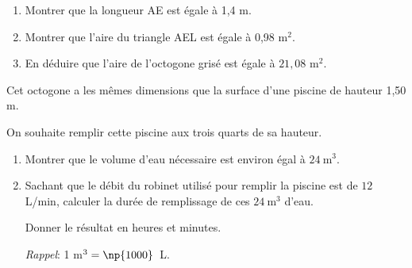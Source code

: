 \documentclass[exercice,a4]{thedocument}%
\begin{document}
\begin{enumerate}
\item 
	\begin{enumerate}
		\item Montrer que la longueur AE est égale à 1,4 m.
		\item Montrer que l'aire du triangle AEL est égale à 0,98 m$^2$.
		\item En déduire que l'aire de l'octogone grisé est égale à $21,08$ m$^2$.
	\end{enumerate}
\begin{minipage}{0.62\linewidth}
\item  Cet octogone a les mêmes dimensions que la surface d'une piscine de hauteur 1,50 m.

On souhaite remplir cette piscine aux trois quarts de sa hauteur.

\end{minipage}\hfill
\begin{minipage}{0.25\linewidth}
\end{minipage}

	\begin{enumerate}
		\item  Montrer que le volume d'eau nécessaire est environ égal à $24~\text{m}^3$.
		\item  Sachant que le débit du robinet utilisé pour remplir la piscine est de $12$~ L/min, calculer la
durée de remplissage de ces $24~\text{m}^3$ d'eau.

Donner le résultat en heures et minutes.

\emph{Rappel}: 1 m$^3 = \np{1000}$~L.
	\end{enumerate}
\end{enumerate}
\showthesource
\end{document}
